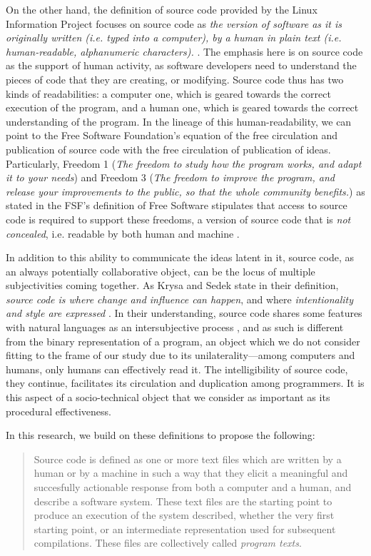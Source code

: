 On the other hand, the definition of source code provided by the Linux Information Project focuses on source code as \emph{the version of software as it is originally written (i.e. typed into a computer), by a human in plain text (i.e. human-readable, alphanumeric characters).} \citep{linuxinformationproject_source_2006}. The emphasis here is on source code as the support of human activity, as software developers need to understand the pieces of code that they are creating, or modifying. Source code thus has two kinds of readabilities: a computer one, which is geared towards the correct execution of the program, and a human one, which is geared towards the correct understanding of the program. In the lineage of this human-readability, we can point to the Free Software Foundation's equation of the free circulation and publication of source code with the free circulation of publication of ideas. Particularly, Freedom 1 (\emph{The freedom to study how the program works, and adapt it to your needs}) and Freedom 3 (\emph{The freedom to improve the program, and release your improvements to the public, so that the whole community benefits.}) as stated in the FSF's definition of Free Software stipulates that access to source code is required to support these freedoms, a version of source code that is \emph{not concealed}, i.e. readable by both human and machine \citep{stallman_free_2002}.

In addition to this ability to communicate the ideas latent in it, source code, as an always potentially collaborative object, can be the locus of multiple subjectivities coming together. As Krysa and Sedek state in their definition, \emph{source code is where change and influence can happen}, and where \emph{intentionality and style are expressed} \citep{fuller_software_2008}. In their understanding, source code shares some features with natural languages as an intersubjective process \citep{voloshinov_marxism_1986}, and as such is different from the binary representation of a program, an object which we do not consider fitting to the frame of our study due to its unilaterality—among computers and humans, only humans can effectively read it. The intelligibility of source code, they continue, facilitates its circulation and duplication among programmers. It is this aspect of a socio-technical object that we consider as important as its procedural effectiveness.

In this research, we build on these definitions to propose the following:

\begin{quote}
    Source code is defined as one or more text files which are written by a human or by a machine in such a way that they elicit a meaningful and succesfully actionable response from both a computer and a human, and describe a software system. These text files are the starting point to produce an execution of the system described, whether the very first starting point, or an intermediate representation used for subsequent compilations. These files are collectively called \emph{program texts}.
\end{quote}


